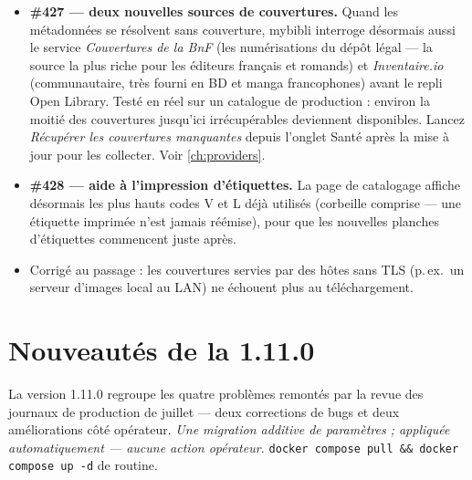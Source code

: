 \begin{itemize}
  \item \textbf{\#427 \string— deux nouvelles sources de
        couvertures.} Quand les métadonnées se résolvent sans
        couverture, mybibli interroge désormais aussi le service
        \emph{Couvertures de la BnF} (les numérisations du dépôt
        légal — la source la plus riche pour les éditeurs français
        et romands) et \emph{Inventaire.io} (communautaire, très
        fourni en BD et manga francophones) avant le repli Open
        Library. Testé en réel sur un catalogue de production :
        environ la moitié des couvertures jusqu'ici irrécupérables
        deviennent disponibles. Lancez \emph{Récupérer les
        couvertures manquantes} depuis l'onglet Santé après la mise
        à jour pour les collecter. Voir \autoref{ch:providers}.
  \item \textbf{\#428 \string— aide à l'impression d'étiquettes.} La
        page de catalogage affiche désormais les plus hauts codes V
        et L déjà utilisés (corbeille comprise — une étiquette
        imprimée n'est jamais réémise), pour que les nouvelles
        planches d'étiquettes commencent juste après.
  \item Corrigé au passage : les couvertures servies par des hôtes
        sans TLS (p.\,ex.\ un serveur d'images local au LAN) ne
        échouent plus au téléchargement.
\end{itemize}

\section{Nouveautés de la 1.11.0}\label{sec:whats-new-1.11.0}

La version 1.11.0 regroupe les quatre problèmes remontés par la revue
des journaux de production de juillet — deux corrections de bugs et
deux améliorations côté opérateur. \emph{Une migration additive de
paramètres ; appliquée automatiquement — aucune action opérateur.}
\texttt{docker compose pull \&\& docker compose up -d} de routine.

